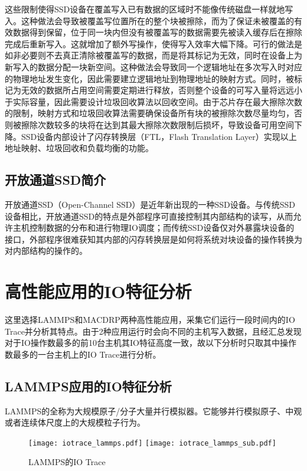 这些限制使得SSD设备在覆盖写入已有数据的区域时不能像传统磁盘一样就地写入。这种做法会导致被覆盖写位置所在的整个块被擦除，而为了保证未被覆盖的有效数据得到保留，位于同一块内但没有被覆盖写的数据需要先被读入缓存后在擦除完成后重新写入。这就增加了额外写操作，使得写入效率大幅下降。可行的做法是如非必要则不去真正清除被覆盖写的数据，而是将其标记为无效，同时在设备上为新写入的数据分配一块新空间。这种做法会导致同一个逻辑地址在多次写入时对应的物理地址发生变化，因此需要建立逻辑地址到物理地址的映射方式。同时，被标记为无效的数据所占用空间需要定期进行释放，否则整个设备的可写入量将远远小于实际容量，因此需要设计垃圾回收算法以回收空间。由于芯片存在最大擦除次数的限制，映射方式和垃圾回收算法需要确保设备所有块的被擦除次数尽量均匀，否则被擦除次数较多的块将在达到其最大擦除次数限制后损坏，导致设备可用空间下降。SSD设备内部设计了闪存转换层（FTL，Flash Translation Layer）实现以上地址映射、垃圾回收和负载均衡的功能。

\subsection{开放通道SSD简介}
开放通道SSD（Open-Channel SSD）是近年新出现的一种SSD设备。与传统SSD设备相比，开放通道SSD的特点是外部程序可直接控制其内部结构的读写，从而允许主机控制数据的分布和进行物理IO调度；而传统SSD设备仅对外暴露块设备的接口，外部程序很难获知其内部的闪存转换层是如何将系统对块设备的操作转换为对内部结构的操作的。

\section{高性能应用的IO特征分析}
这里选择LAMMPS和MACDRP两种高性能应用，采集它们运行一段时间内的IO Trace并分析其特点。由于2种应用运行时会向不同的主机写入数据，且经汇总发现对于IO操作数最多的前10台主机其IO特征高度一致，故以下分析时只取其中操作数最多的一台主机上的IO Trace进行分析。
\subsection{LAMMPS应用的IO特征分析}
LAMMPS的全称为大规模原子/分子大量并行模拟器。它能够并行模拟原子、中观或者连续体尺度上的大规模粒子行为。

\begin{figure}[H]
  \centering
    {\texttt{[image: iotrace\_lammps.pdf]}}
  \hspace{4em}
      {\texttt{[image: iotrace\_lammps\_sub.pdf]}}
  \caption{LAMMPS的IO Trace}
  \label{fig:iotrace_lammps_all}
\end{figure}


